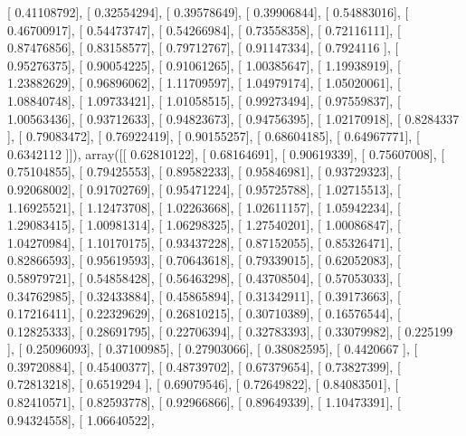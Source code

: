 \documentclass{article}
\begin{document}
       [ 0.41108792],
       [ 0.32554294],
       [ 0.39578649],
       [ 0.39906844],
       [ 0.54883016],
       [ 0.46700917],
       [ 0.54473747],
       [ 0.54266984],
       [ 0.73558358],
       [ 0.72116111],
       [ 0.87476856],
       [ 0.83158577],
       [ 0.79712767],
       [ 0.91147334],
       [ 0.7924116 ],
       [ 0.95276375],
       [ 0.90054225],
       [ 0.91061265],
       [ 1.00385647],
       [ 1.19938919],
       [ 1.23882629],
       [ 0.96896062],
       [ 1.11709597],
       [ 1.04979174],
       [ 1.05020061],
       [ 1.08840748],
       [ 1.09733421],
       [ 1.01058515],
       [ 0.99273494],
       [ 0.97559837],
       [ 1.00563436],
       [ 0.93712633],
       [ 0.94823673],
       [ 0.94756395],
       [ 1.02170918],
       [ 0.8284337 ],
       [ 0.79083472],
       [ 0.76922419],
       [ 0.90155257],
       [ 0.68604185],
       [ 0.64967771],
       [ 0.6342112 ]]), array([[ 0.62810122],
       [ 0.68164691],
       [ 0.90619339],
       [ 0.75607008],
       [ 0.75104855],
       [ 0.79425553],
       [ 0.89582233],
       [ 0.95846981],
       [ 0.93729323],
       [ 0.92068002],
       [ 0.91702769],
       [ 0.95471224],
       [ 0.95725788],
       [ 1.02715513],
       [ 1.16925521],
       [ 1.12473708],
       [ 1.02263668],
       [ 1.02611157],
       [ 1.05942234],
       [ 1.29083415],
       [ 1.00981314],
       [ 1.06298325],
       [ 1.27540201],
       [ 1.00086847],
       [ 1.04270984],
       [ 1.10170175],
       [ 0.93437228],
       [ 0.87152055],
       [ 0.85326471],
       [ 0.82866593],
       [ 0.95619593],
       [ 0.70643618],
       [ 0.79339015],
       [ 0.62052083],
       [ 0.58979721],
       [ 0.54858428],
       [ 0.56463298],
       [ 0.43708504],
       [ 0.57053033],
       [ 0.34762985],
       [ 0.32433884],
       [ 0.45865894],
       [ 0.31342911],
       [ 0.39173663],
       [ 0.17216411],
       [ 0.22329629],
       [ 0.26810215],
       [ 0.30710389],
       [ 0.16576544],
       [ 0.12825333],
       [ 0.28691795],
       [ 0.22706394],
       [ 0.32783393],
       [ 0.33079982],
       [ 0.225199  ],
       [ 0.25096093],
       [ 0.37100985],
       [ 0.27903066],
       [ 0.38082595],
       [ 0.4420667 ],
       [ 0.39720884],
       [ 0.45400377],
       [ 0.48739702],
       [ 0.67379654],
       [ 0.73827399],
       [ 0.72813218],
       [ 0.6519294 ],
       [ 0.69079546],
       [ 0.72649822],
       [ 0.84083501],
       [ 0.82410571],
       [ 0.82593778],
       [ 0.92966866],
       [ 0.89649339],
       [ 1.10473391],
       [ 0.94324558],
       [ 1.06640522],
\end{document}
